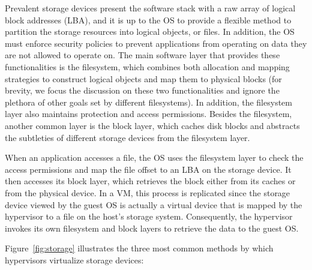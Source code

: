 Prevalent storage devices present the software stack with a raw array of logical block addresses (LBA), and it is up to the OS to provide a flexible method to partition the storage resources into logical objects, or files. In addition, the OS must enforce security policies to prevent applications from operating on data they are not allowed to operate on.
%
The main software layer that provides these functionalities is the filesystem, which combines both allocation and mapping strategies to construct logical objects and map them to physical blocks (for brevity, we focus the discussion on these two functionalities and ignore the plethora of other goals set by different filesystems). In addition, the filesystem layer also maintains protection and access permissions. Besides the filesystem, another common layer is the block layer, which caches disk blocks and abstracts the subtleties of different storage devices from the filesystem layer.

When an application accesses a file, the OS uses the filesystem layer to check the access permissions and map the file offset to an LBA on the storage device. It then accesses its block layer, which retrieves the block either from its caches or from the physical device. In a VM, this process is replicated since the storage device viewed by the guest OS is actually a virtual device that is mapped by the hypervisor to a file on the host's storage system. Consequently, the hypervisor invokes its own filesystem and block layers to retrieve the data to the guest OS. 

Figure~\ref{fig:storage} illustrates the three most common methods by which hypervisors virtualize storage devices:


